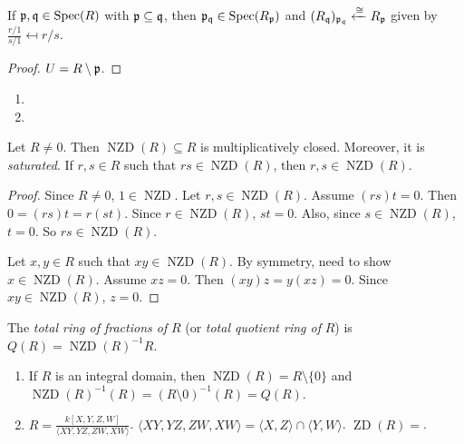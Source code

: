 \begin{corollary}
    If $\mathfrak{p},\mathfrak{q} \in \operatorname{Spec}(R)$ with $\mathfrak{p} \subseteq \mathfrak{q}$, then $\mathfrak{p}_{\mathfrak{q}} \in \operatorname{Spec}(R_{\mathfrak{p}})$ and $(R_{\mathfrak{q}})_{\mathfrak{p}_{\mathfrak{q}}} \xleftarrow \cong R_{\mathfrak{p}}$ given by $\frac{r/1}{s/1} \mapsfrom r/s$.
\end{corollary}

\begin{proof}
    $U = R \setminus \mathfrak{p}$.
\end{proof}

\begin{example}
    \begin{enumerate}
        \item 
        \item 
    \end{enumerate}
\end{example}

\begin{proposition}
    Let $R \neq 0$. Then $\operatorname{NZD}(R) \subseteq R$ is multiplicatively closed. Moreover, it is \emph{saturated}. If $r,s \in R$ such that $rs \in \operatorname{NZD}(R)$, then $r,s \in \operatorname{NZD}(R)$.
\end{proposition}

\begin{proof}
    Since $R \neq 0$, $1 \in \operatorname{NZD}$. Let $r,s \in \operatorname{NZD}(R)$. Assume $(rs)t=0$. Then $0 = (rs)t = r(st)$. Since $r \in \operatorname{NZD}(R)$, $st = 0$. Also, since $s \in \operatorname{NZD}(R)$, $t = 0$. So $rs \in \operatorname{NZD}(R)$. \par 
    Let $x,y \in R$ such that $xy \in \operatorname{NZD}(R)$. By symmetry, need to show $x \in \operatorname{NZD}(R)$. Assume $xz = 0$. Then $(xy)z = y(xz) = 0$. Since $xy \in \operatorname{NZD}(R)$, $z = 0$.
\end{proof}

\begin{definition}
    The \emph{total ring of fractions of} $R$ (or \emph{total quotient ring of }$R$) is $Q(R) = \operatorname{NZD}(R)^{-1}R$.
\end{definition}

\begin{example}
    \begin{enumerate}
        \item If $R$ is an integral domain, then $\operatorname{NZD}(R) = R \setminus \{0\}$ and $\operatorname{NZD}(R)^{-1}(R) = (R \setminus 0)^{-1}(R) = Q(R)$.
        \item $R = \frac{k[X,Y,Z,W]}{\langle XY,YZ,ZW,XW \rangle}$. $\langle XY,YZ,ZW,XW \rangle = \langle X,Z \rangle \cap \langle Y,W \rangle$. $\operatorname{ZD}(R) = $.
    \end{enumerate}
\end{example}

